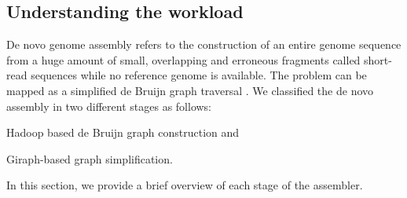 \documentclass[conference]{IEEEtran}
\begin{document}
\subsection {Understanding the workload} \label{TheWorkload}
De novo genome assembly refers to the construction of an entire genome sequence from a huge amount of small, overlapping and erroneous fragments called short-read sequences while no reference genome is available.
The problem can be mapped as a simplified de Bruijn graph traversal \cite{bio:debruijngraph}. 
We classified the de novo assembly in two different stages as follows:
\begin{inparaenum}
\item Hadoop based de Bruijn graph construction and
\item Giraph-based graph simplification.  
\end{inparaenum}
In this section, we provide a brief overview of each stage of the assembler. 
\end{document}
